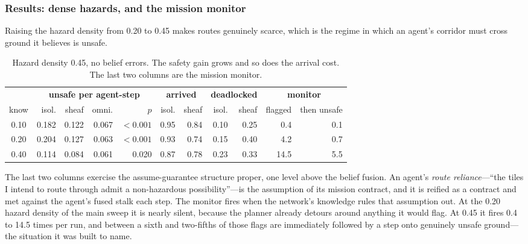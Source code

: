 \documentclass[11pt]{article}
\newif\ifshowcomments
\theoremstyle{definition}
\theoremstyle{remark}
\newcommand{\ai}[1]{%
    \ifshowcomments
        \noindent\textcolor{techred}{[AI Agent]: #1}%
    \fi
}
\begin{document}
\subsubsection{Results: dense hazards, and the mission monitor}
\label{sec:dense}

Raising the hazard density from 0.20 to 0.45 makes routes genuinely scarce, which is the regime
in which an agent's corridor must cross ground it believes is unsafe.

\begin{table}[h]
\centering
\small
\begin{tabular}{@{}c rrrr rr rr rr@{}}
\toprule
& \multicolumn{4}{c}{\textbf{unsafe per agent-step}} & \multicolumn{2}{c}{\textbf{arrived}} & \multicolumn{2}{c}{\textbf{deadlocked}} & \multicolumn{2}{c}{\textbf{monitor}} \\
\cmidrule(lr){2-5}\cmidrule(lr){6-7}\cmidrule(lr){8-9}\cmidrule(lr){10-11}
know & isol. & sheaf & omni. & $p$ & isol. & sheaf & isol. & sheaf & flagged & then unsafe \\
\midrule
0.10 & 0.182 & 0.122 & 0.067 & $<0.001$ & 0.95 & 0.84 & 0.10 & 0.25 & 0.4  & 0.1 \\
0.20 & 0.204 & 0.127 & 0.063 & $<0.001$ & 0.93 & 0.74 & 0.15 & 0.40 & 4.2  & 0.7 \\
0.40 & 0.114 & 0.084 & 0.061 & 0.020    & 0.87 & 0.78 & 0.23 & 0.33 & 14.5 & 5.5 \\
\bottomrule
\end{tabular}
\caption{Hazard density 0.45, no belief errors. The safety gain grows and so does the arrival
cost. The last two columns are the mission monitor.}
\label{tab:dense}
\end{table}

The last two columns exercise the assume-guarantee structure proper, one level above the belief
fusion.
An agent's \emph{route reliance}---``the tiles I intend to route through admit a non-hazardous
possibility''---is the assumption of its mission contract, and it is reified as a contract and
met against the agent's fused stalk each step.
The monitor fires when the network's knowledge rules that assumption out.
At the 0.20 hazard density of the main sweep it is nearly silent, because the planner already
detours around anything it would flag.
At 0.45 it fires 0.4 to 14.5 times per run, and between a sixth and two-fifths of those flags
are immediately followed by a step onto genuinely unsafe ground---the situation it was built to
name.

\ai{\textbf{Open item, not a gap in the deliverable.} The mission monitor is well-formed and
predictive but purely advisory: nothing in the system consumes it. The same is true of the
contested-tile read-out. The obvious use of both is a routing cost---a tile the network
\emph{disagrees} about is not the same as a tile nobody has an opinion about, yet the planner
currently prices them identically. This is a task-layer improvement rather than a missing
milestone deliverable, and it belongs in the Task~6 roadmap alongside the yielding contract of
\S\ref{sec:progress}.}
\end{document}
